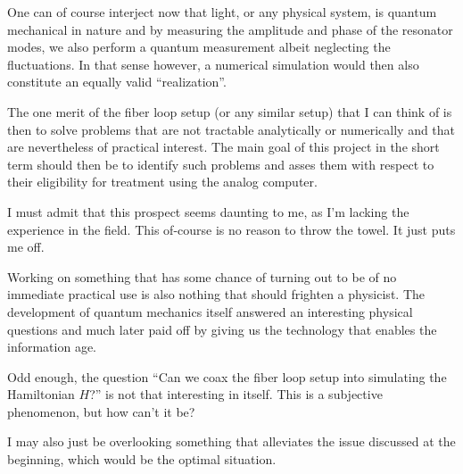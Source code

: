 \documentclass[fontsize=10pt,paper=a4,open=any,
twoside=no,toc=listof,toc=bibliography,headings=optiontohead,
captions=nooneline,captions=tableabove,english,DIV=15,numbers=noenddot,final,parskip=half-,
headinclude=true,footinclude=false,BCOR=0mm]{scrartcl}
\begin{document}
One can of course interject now that light, or any physical system, is
quantum mechanical in nature and by measuring the amplitude and phase
of the resonator modes, we also perform a quantum measurement albeit
neglecting the fluctuations. In that sense however, a numerical simulation
would then also constitute an equally valid ``realization''.

The one merit of the fiber loop setup (or any similar setup) that I
can think of is then to solve problems that are not tractable
analytically or numerically and that are nevertheless of practical
interest. The main goal of this project in the short term should then
be to identify such problems and asses them with respect to their
eligibility for treatment using the analog computer.

I must admit that this prospect seems daunting to me, as I'm lacking
the experience in the field. This of-course is no reason to throw the
towel. It just puts me off.

Working on something that has some chance of turning out to be of no
immediate practical use is also nothing that should frighten a
physicist. The development of quantum mechanics itself answered an
interesting physical questions and much later paid off by giving us
the technology that enables the information age.

Odd enough, the question ``Can we coax the fiber loop setup into
simulating the Hamiltonian \(H\)?''  is not that interesting in
itself. This is a subjective phenomenon, but how can't it be?

I may also just be overlooking something that alleviates the issue
discussed at the beginning, which would be the optimal situation.

\printbibliography{}
\end{document}
